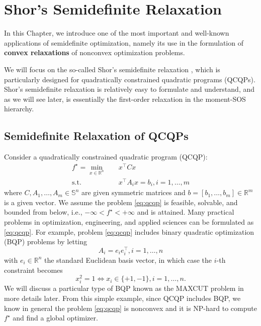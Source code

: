 \documentclass[
]{book}
\theoremstyle{definition}
\theoremstyle{definition}
\theoremstyle{definition}
\theoremstyle{definition}
\theoremstyle{remark}
\begin{document}
\citep{mansour09arxiv-domain}

\chapter{Shor's Semidefinite Relaxation}\label{Shor}

In this Chapter, we introduce one of the most important and well-known applications of semidefinite optimization, namely its use in the formulation of \textbf{convex relaxations} of nonconvex optimization problems.

We will focus on the so-called Shor's semidefinite relaxation \citep{shor87sjcss-quadratic}, which is particularly designed for quadratically constrained quadratic programs (QCQPs). Shor's semidefinite relaxation is relatively easy to formulate and understand, and as we will see later, is essentially the first-order relaxation in the moment-SOS hierarchy.

\section{Semidefinite Relaxation of QCQPs}\label{semidefinite-relaxation-of-qcqps}

Consider a quadratically constrained quadratic program (QCQP):
\begin{equation}
\begin{split}
f^\star = \min_{x \in \mathbb{R}^{n}} & \quad x^\top C x \\
\mathrm{s.t.}& \quad x^\top A_i x = b_i, i=1,\dots,m
\end{split}
\label{eq:qcqp}
\end{equation}
where \(C,A_1,\dots,A_m \in \mathbb{S}^{n}\) are given symmetric matrices and \(b = [b_1,\dots,b_m] \in \mathbb{R}^{m}\) is a given vector. We assume the problem \eqref{eq:qcqp} is feasible, solvable, and bounded from below, i.e., \(-\infty < f^\star < +\infty\) and is attained. Many practical problems in optimization, engineering, and applied sciences can be formulated as \eqref{eq:qcqp}. For example, problem \eqref{eq:qcqp} includes binary quadratic optimization (BQP) problems by letting
\[
A_i = e_i e_i^\top, i=1,\dots,n
\]
with \(e_i \in \mathbb{R}^{n}\) the standard Euclidean basis vector, in which case the \(i\)-th constraint becomes
\[
x_i^2 = 1 \Leftrightarrow x_i \in \{+1,-1\},i=1,\dots,n.
\]
We will discuss a particular type of BQP known as the MAXCUT problem in more details later. From this simple example, since QCQP includes BQP, we know in general the problem \eqref{eq:qcqp} is nonconvex and it is NP-hard to compute \(f^\star\) and find a global optimizer.
\end{document}
